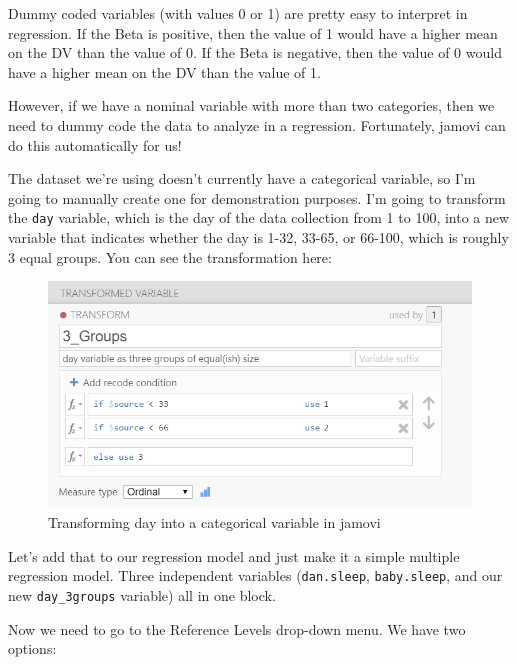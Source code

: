 \documentclass[
]{book}
\begin{document}
Dummy coded variables (with values 0 or 1) are pretty easy to interpret in regression. If the Beta is positive, then the value of 1 would have a higher mean on the DV than the value of 0. If the Beta is negative, then the value of 0 would have a higher mean on the DV than the value of 1.

However, if we have a nominal variable with more than two categories, then we need to dummy code the data to analyze in a regression. Fortunately, jamovi can do this automatically for us!

The dataset we're using doesn't currently have a categorical variable, so I'm going to manually create one for demonstration purposes. I'm going to transform the \texttt{day} variable, which is the day of the data collection from 1 to 100, into a new variable that indicates whether the day is 1-32, 33-65, or 66-100, which is roughly 3 equal groups. You can see the transformation here:

\begin{figure}

{\centering \includegraphics[width=1\linewidth]{images/13-regression/transform} 

}

\caption{Transforming day into a categorical variable in jamovi}\label{fig:unnamed-chunk-13}
\end{figure}

Let's add that to our regression model and just make it a simple multiple regression model. Three independent variables (\texttt{dan.sleep}, \texttt{baby.sleep}, and our new \texttt{day\_3groups} variable) all in one block.

Now we need to go to the Reference Levels drop-down menu. We have two options:
\end{document}
